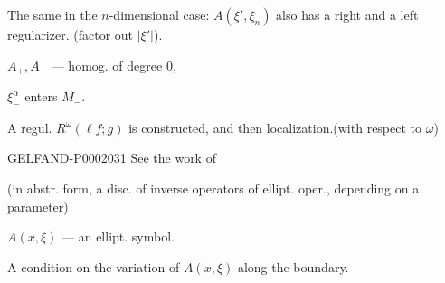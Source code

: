 The same in the $n$-dimensional case: $A (\xi',\xi_n)$ also has a right and a left regularizer. (factor out $|\xi'|$).



$A_+, A_-$ --- homog. of degree $0$,



$\xi_-^\alpha$ enters $M_-$.



A regul. $R^\omega (\ell f; g)$ is constructed, and then localization.\quad (with respect to $\omega$)



\begin{GelfandAdjacentEvidence}{GELFAND-P000203}{1}
See the work of 



\end{GelfandAdjacentEvidence}

(in abstr. form, a disc. of inverse operators of ellipt. oper., depending on a parameter)











$A (x,\xi)$ --- an ellipt. symbol.



A condition on the variation of $A (x,\xi)$ along the boundary.




